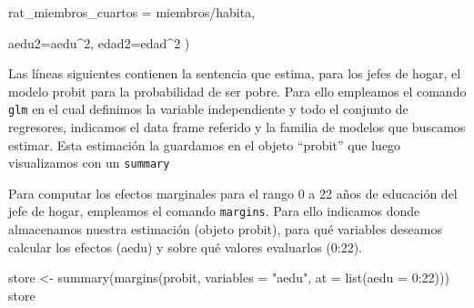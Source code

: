 \documentclass[
]{book}
\newenvironment{Shaded}{\begin{snugshade}}{\end{snugshade}}
\newcommand{\AttributeTok}[1]{\textcolor[rgb]{0.77,0.63,0.00}{#1}}
\newcommand{\DecValTok}[1]{\textcolor[rgb]{0.00,0.00,0.81}{#1}}
\newcommand{\FunctionTok}[1]{\textcolor[rgb]{0.00,0.00,0.00}{#1}}
\newcommand{\NormalTok}[1]{#1}
\newcommand{\OtherTok}[1]{\textcolor[rgb]{0.56,0.35,0.01}{#1}}
\newcommand{\SpecialCharTok}[1]{\textcolor[rgb]{0.00,0.00,0.00}{#1}}
\newcommand{\StringTok}[1]{\textcolor[rgb]{0.31,0.60,0.02}{#1}}
\begin{document}
\begin{Shaded}
\begin{Highlighting}[]
                     \AttributeTok{rat\_miembros\_cuartos =}\NormalTok{ miembros}\SpecialCharTok{/}\NormalTok{habita,}
                     
                     \AttributeTok{aedu2=}\NormalTok{aedu}\SpecialCharTok{\^{}}\DecValTok{2}\NormalTok{,}
                     \AttributeTok{edad2=}\NormalTok{edad}\SpecialCharTok{\^{}}\DecValTok{2}\NormalTok{ )}
\end{Highlighting}
\end{Shaded}

Las líneas siguientes contienen la sentencia que estima, para los jefes de hogar, el modelo probit para la probabilidad de ser pobre. Para ello empleamos el comando \texttt{glm} en el cual definimos la variable independiente y todo el conjunto de regresores, indicamos el data frame referido y la familia de modelos que buscamos estimar. Esta estimación la guardamos en el objeto ``probit'' que luego visualizamos con un \texttt{summary}

Para computar los efectos marginales para el rango 0 a 22 años de educación del jefe de hogar, empleamos el comando \texttt{margins}. Para ello indicamos donde almacenamos nuestra estimación (objeto probit), para qué variables deseamos calcular los efectos (aedu) y sobre qué valores evaluarlos (0:22).

\begin{Shaded}
\begin{Highlighting}[]
\NormalTok{store }\OtherTok{\textless{}{-}} \FunctionTok{summary}\NormalTok{(}\FunctionTok{margins}\NormalTok{(probit, }\AttributeTok{variables =} \StringTok{"aedu"}\NormalTok{, }\AttributeTok{at =} \FunctionTok{list}\NormalTok{(}\AttributeTok{aedu =} \DecValTok{0}\SpecialCharTok{:}\DecValTok{22}\NormalTok{)))}
\NormalTok{store}
\end{Highlighting}
\end{Shaded}
\end{document}
